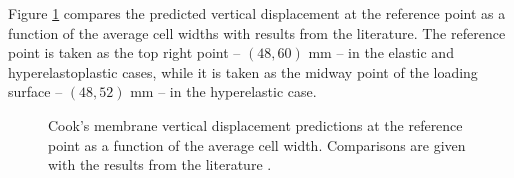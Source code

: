 \documentclass[sn-mathphys,Numbered]{sn-jnl}%
\begin{document}
Figure \ref{fig:cooksMembrane_disp} compares the predicted vertical displacement at the reference point as a function of the average cell widths with results from the literature.
The reference point is taken as the top right point -- $(48,60)$ mm -- in the elastic and hyperelastoplastic cases, while it is taken as the midway point of the loading surface -- $(48,52)$ mm -- in the hyperelastic case.
\begin{figure}[htbp]
   \centering
   \caption{Cook's membrane vertical displacement predictions at the reference point as a function of the average cell width. Comparisons are given with the results from the literature \cite{Zienkiewicz2000, Pelteret2018, Simo1992, Simplas}.}
   \label{fig:cooksMembrane_disp}
\end{figure}
\end{document}
